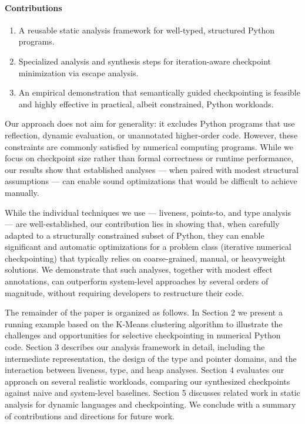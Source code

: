 \paragraph{Contributions}
\begin{enumerate}
    \item A reusable static analysis framework for well-typed, structured Python programs.
    \item Specialized analysis and synthesis steps for iteration-aware checkpoint minimization via escape analysis.
    \item An empirical demonstration that semantically guided checkpointing is feasible and highly effective in practical, albeit constrained, Python workloads.
\end{enumerate}

Our approach does not aim for generality: it excludes Python programs that use reflection, dynamic evaluation, or unannotated higher-order code. However, these constraints are commonly satisfied by numerical computing programs. While we focus on checkpoint size rather than formal correctness or runtime performance, our results show that established analyses --- when paired with modest structural assumptions --- can enable sound optimizations that would be difficult to achieve manually.

While the individual techniques we use --- liveness, points-to, and type analysis --- are well-established, our contribution lies in showing that, when carefully adapted to a structurally constrained subset of Python, they can enable significant and automatic optimizations for a problem class (iterative numerical checkpointing) that typically relies on coarse-grained, manual, or heavyweight solutions. We demonstrate that such analyses, together with modest effect annotations, can outperform system-level approaches by several orders of magnitude, without requiring developers to restructure their code.

The remainder of the paper is organized as follows. In Section 2 we present a running example based on the K-Means clustering algorithm to illustrate the challenges and opportunities for selective checkpointing in numerical Python code. Section 3 describes our analysis framework in detail, including the intermediate representation, the design of the type and pointer domains, and the interaction between liveness, type, and heap analyses. Section 4 evaluates our approach on several realistic workloads, comparing our synthesized checkpoints against naive and system-level baselines. Section 5 discusses related work in static analysis for dynamic languages and checkpointing. We conclude with a summary of contributions and directions for future work.
